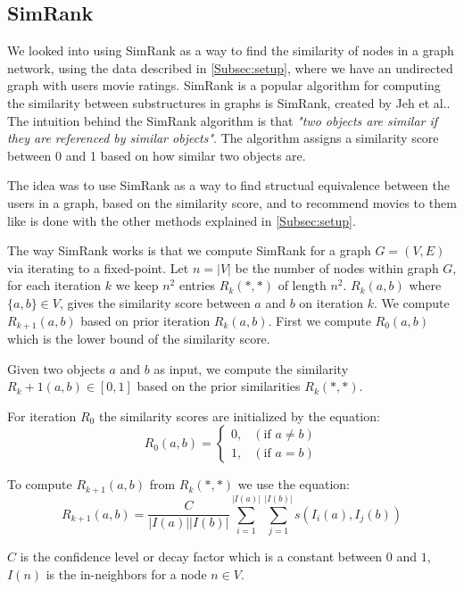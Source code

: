 \subsection{SimRank}
\label{Subsec:SimRank}
We looked into using SimRank as a way to find the similarity of nodes in a graph network, using the data described in \autoref{Subsec:setup}, where we have an undirected graph with users movie ratings.
SimRank is a popular algorithm for computing the similarity between substructures in graphs is SimRank, created by Jeh et al.\cite{10.1145/775047.775126}.
The intuition behind the SimRank algorithm is that \emph{"two objects are similar if they are referenced by similar objects"}\cite{10.1145/775047.775126}. The algorithm assigns a similarity score between 0 and 1 based on how similar two objects are.

The idea was to use SimRank as a way to find structual equivalence between the users in a graph, based on the similarity score, and to recommend movies to them like is done with the other methods explained in \autoref{Subsec:setup}.

The way SimRank works is that we compute SimRank for a graph $G = (V,E)$ via iterating to a fixed-point. 
Let $n = |V|$ be the number of nodes within graph $G$, for each iteration $k$ we keep $n^2$ entries $R_k(*,*)$ of length $n^2$.
$R_k(a,b)$ where $\{a,b\} \in V$, gives the similarity score between $a$ and $b$ on iteration $k$\cite{10.1145/775047.775126}.
We compute $R_{k+1}(a,b)$ based on prior iteration $R_k(a,b)$.
First we compute $R_0(a,b)$ which is the lower bound of the similarity score.

\begin{definition}[SimRank]\label{def:simrank} Given two objects $a$ and $b$ as input, we compute the similarity $R_k+1(a,b) \in [0,1]$ based on the prior similarities $R_k(*,*)$.

For iteration $R_0$ the similarity scores are initialized by the equation:
\begin{equation}\label{eq:lowerbound_sim_score}
R_0(a,b)= \begin{cases}
0, & (\text{if } a \neq b) \\

1 ,& (\text{if } a = b)
\end{cases}
\end{equation}

To compute $R_{k+1}(a,b)$ from $R_k(*,*)$ we use the equation:
\begin{equation}\label{eq:simrank_computation}
R_{k+1}(a,b)= \frac{C}{|I(a)||I(b)|}\sum^{|I(a)|}_{i=1}\sum^{|I(b)|}_{j=1}s(I_i(a),I_j(b))
\end{equation}

$C$ is the confidence level or decay factor which is a constant between $0$ and $1$, $I(n)$ is the in-neighbors for a node $n \in V$.

\end{definition}

